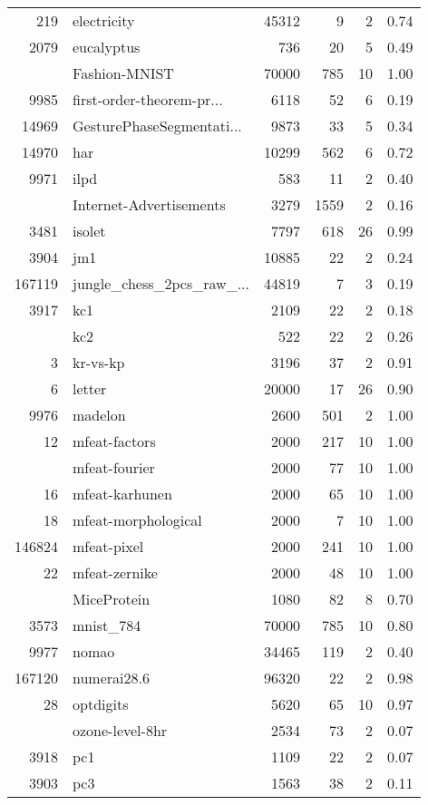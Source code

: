 \begin{longtable}{rlrrrp{2em}}
219 & electricity & 45312 & 9 & 2 & 0.74 \\
2079 & eucalyptus & 736 & 20 & 5 & 0.49 \\
\addlinespace
146825 & Fashion-MNIST & 70000 & 785 & 10 & 1.00 \\
9985 & first-order-theorem-pr... & 6118 & 52 & 6 & 0.19 \\
14969 & GesturePhaseSegmentati... & 9873 & 33 & 5 & 0.34 \\
14970 & har & 10299 & 562 & 6 & 0.72 \\
9971 & ilpd & 583 & 11 & 2 & 0.40 \\
\addlinespace
167125 & Internet-Advertisements & 3279 & 1559 & 2 & 0.16 \\
3481 & isolet & 7797 & 618 & 26 & 0.99 \\
3904 & jm1 & 10885 & 22 & 2 & 0.24 \\
167119 & jungle\_chess\_2pcs\_raw\_... & 44819 & 7 & 3 & 0.19 \\
3917 & kc1 & 2109 & 22 & 2 & 0.18 \\
\addlinespace
3913 & kc2 & 522 & 22 & 2 & 0.26 \\
3 & kr-vs-kp & 3196 & 37 & 2 & 0.91 \\
6 & letter & 20000 & 17 & 26 & 0.90 \\
9976 & madelon & 2600 & 501 & 2 & 1.00 \\
12 & mfeat-factors & 2000 & 217 & 10 & 1.00 \\
\addlinespace
14 & mfeat-fourier & 2000 & 77 & 10 & 1.00 \\
16 & mfeat-karhunen & 2000 & 65 & 10 & 1.00 \\
18 & mfeat-morphological & 2000 & 7 & 10 & 1.00 \\
146824 & mfeat-pixel & 2000 & 241 & 10 & 1.00 \\
22 & mfeat-zernike & 2000 & 48 & 10 & 1.00 \\
\addlinespace
146800 & MiceProtein & 1080 & 82 & 8 & 0.70 \\
3573 & mnist\_784 & 70000 & 785 & 10 & 0.80 \\
9977 & nomao & 34465 & 119 & 2 & 0.40 \\
167120 & numerai28.6 & 96320 & 22 & 2 & 0.98 \\
28 & optdigits & 5620 & 65 & 10 & 0.97 \\
\addlinespace
9978 & ozone-level-8hr & 2534 & 73 & 2 & 0.07 \\
3918 & pc1 & 1109 & 22 & 2 & 0.07 \\
3903 & pc3 & 1563 & 38 & 2 & 0.11 \\

\end{longtable}
